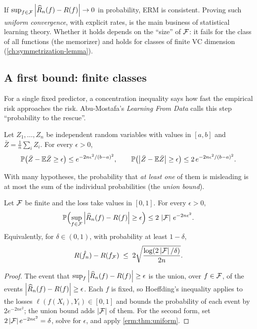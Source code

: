 \begin{notechapter}
\begin{keyidea}
If $\sup_{f\in\mathcal{F}}\left|\widehat{R}_n(f) - R(f)\right| \to 0$ in probability, ERM is
consistent. Proving such \emph{uniform convergence}, with explicit rates, is
the main business of statistical learning theory. Whether it holds depends on
the ``size'' of $\mathcal{F}$: it fails for the class of all functions (the
memorizer) and holds for classes of finite VC dimension
(\cref{ch:symmetrization-lemma}).
\end{keyidea}

\subsection{A first bound: finite classes}

For a single fixed predictor, a concentration inequality says how fast the
empirical risk approaches the risk. Abu-Mostafa's \emph{Learning From Data}
calls this step ``probability to the rescue''.

\begin{lemma}
Let $Z_1,\dots,Z_n$ be independent random variables with values in $[a,b]$ and
$\bar Z = \frac1n\sum_i Z_i$. For every $\epsilon > 0$,
\[
  \mathbb{P}\bigl(\bar Z - \mathbb{E}\bar Z \geq \epsilon\bigr) \leq e^{-2n\epsilon^2/(b-a)^2},
  \qquad
  \mathbb{P}\bigl(\left|\bar Z - \mathbb{E}\bar Z\right| \geq \epsilon\bigr) \leq 2\,e^{-2n\epsilon^2/(b-a)^2}.
\]
\end{lemma}

With many hypotheses, the probability that \emph{at least one} of them is
misleading is at most the sum of the individual probabilities (the
\emph{union bound}).

\begin{theorem}\label{erm:thm:finite}
Let $\mathcal{F}$ be finite and the loss take values in $[0,1]$. For every
$\epsilon>0$,
\[
  \mathbb{P}\Bigl(\sup_{f\in\mathcal{F}}\left|\widehat{R}_n(f) - R(f)\right| \geq \epsilon\Bigr) \leq 2\,\left|\mathcal{F}\right|\,e^{-2n\epsilon^2}.
\]
Equivalently, for $\delta\in(0,1)$, with probability at least $1-\delta$,
\[
  R(\hat f_n) - R(f_{\mathcal{F}}) \;\leq\; 2\sqrt{\frac{\log(2\left|\mathcal{F}\right|/\delta)}{2n}} .
\]
\end{theorem}

\begin{proof}
The event that $\sup_f\left|\widehat{R}_n(f) - R(f)\right|\geq\epsilon$ is the union,
over $f\in\mathcal{F}$, of the events $\left|\widehat{R}_n(f) - R(f)\right|\geq\epsilon$. Each $f$ is
fixed, so Hoeffding's inequality applies to the losses
$\ell(f(X_i),Y_i)\in[0,1]$ and bounds the probability of each event by
$2e^{-2n\epsilon^2}$; the union bound adds $\left|\mathcal{F}\right|$ of them. For the second
form, set $2\left|\mathcal{F}\right|e^{-2n\epsilon^2} = \delta$, solve for $\epsilon$, and apply
\cref{erm:thm:uniform}.
\end{proof}


\end{notechapter}
